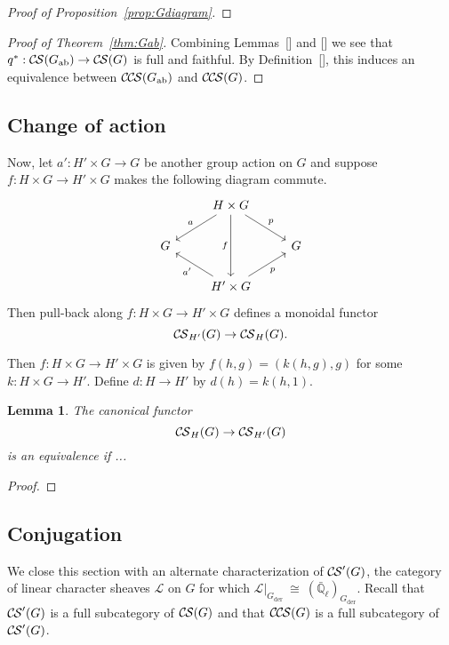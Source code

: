 \documentclass[10pt]{amsart}
\theoremstyle{plain}
\newtheorem{lemma}[theorem]{Lemma}
\theoremstyle{definition}
\newcommand{\EE}{\mathbb{\bar Q}_\ell}
\newcommand{\der}{_{\operatorname{der}}}
\newcommand{\ab}{_{\operatorname{ab}}}
\newcommand{\iso}{{\ \cong\ }}
\newcommand{\cs}[1]{{\mathcal{#1}}}
\newcommand{\CS}{{\mathcal{C\hskip-0.8pt S}}}
\newcommand{\CCS}{{\mathcal{C\hskip-.8pt C\hskip-0.8pt S}}}
\begin{document}
\begin{proof}[Proof of Proposition~\ref{prop:Gdiagram}]

\end{proof}

\begin{proof}[Proof of Theorem~\ref{thm:Gab}]
Combining Lemmas~[] and [] we see that $q^* : \CS(G\ab) \to \CS(G)$ is full and faithful.
By Definition~[], this induces an equivalence between $\CCS(G\ab)$ and $\CCS(G)$. 
\end{proof}

\iffalse

\subsection{Change of action}

Now, let $a' : H'\times G \to G$ be another group action on $G$ and suppose $f: H \times G \to H'\times G$ makes the following diagram commute.
\[
\begin{tikzcd}
&  \arrow{dl}[swap]{a} H \times G \arrow{dr}{p} \arrow{dd}[swap]{f} & \\
G & & G \\
& \arrow{ul}{a'} H' \times G \arrow{ur}[swap]{p} & 
\end{tikzcd}
\]
Then pull-back along $f: H\times G \to H'\times G$ defines a monoidal functor 
\[
\CS_{H'}(G) \to \CS_{H}(G).
\]


Then $f : H\times G \to H'\times G$ is given by $f(h,g) = (k(h,g),g)$ for some $k : H\times G\to H'$. 
Define $d : H\to H'$ by $d(h) = k(h,1)$.




\begin{lemma}\label{lem:action}
The canonical functor
\[
\CS_{H}(G) \to \CS_{H'}(G)
\]
is an equivalence if ...
\end{lemma}
\begin{proof}
\end{proof}

\subsection{Conjugation}

We close this section with an alternate characterization of $\CS'(G)$, the category of linear character sheaves $\cs{L}$ on $G$ for which $\cs{L}\vert_{G\der} \iso (\EE)_{G\der}$.
Recall that $\CS'(G)$ is a full subcategory of $\CS(G)$ and that $\CCS(G)$ is a full subcategory of $\CS'(G)$.
\end{document}
